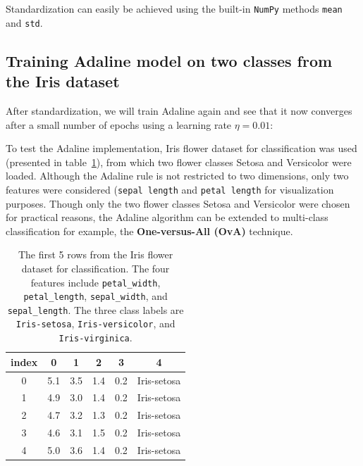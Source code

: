 \documentclass[11pt]{article}
\begin{document}
    Standardization can easily be achieved using the built-in \texttt{NumPy} methods \texttt{mean} and \texttt{std}.

    \subsection{Training Adaline model on two classes from the Iris dataset} \label{subsec:ada_iris}

    After standardization, we will train Adaline again and see that it now converges after a small number of epochs using a learning rate $\eta=0.01$:

    To test the Adaline implementation, Iris flower dataset for classification was used (presented in table~\ref{tab:iris}), from which two flower classes Setosa and Versicolor were loaded.
    Although the Adaline rule is not restricted to two dimensions, only two features were considered (\texttt{sepal length} and \texttt{petal length} for visualization purposes.
    Though only the two flower classes Setosa and Versicolor were chosen for practical reasons, the Adaline algorithm can be extended to multi-class classification \textemdash for example, the \textbf{One-versus-All (OvA)} technique.

    \begin{table}[h!]
        \centering
        \begin{tabular}{||c | c c c c | c||}
            \hline
            index & 0 & 1 & 2 & 3 & 4 \\
            \hline
            \hline
            0 & 5.1 & 3.5 & 1.4 & 0.2 & Iris-setosa \\
            \hline
            1 & 4.9 & 3.0 & 1.4 & 0.2 & Iris-setosa \\
            \hline
            2 & 4.7 & 3.2 & 1.3 & 0.2 & Iris-setosa \\
            \hline
            3 & 4.6 & 3.1 & 1.5 & 0.2 & Iris-setosa \\
            \hline
            4 & 5.0 & 3.6 & 1.4 & 0.2 & Iris-setosa \\
            \hline
        \end{tabular}
        \caption{The first 5 rows from the Iris flower dataset for classification.
        The four features include \texttt{petal\_width}, \texttt{petal\_length}, \texttt{sepal\_width}, and \texttt{sepal\_length}.
        The three class labels are \texttt{Iris-setosa}, \texttt{Iris-versicolor}, and \texttt{Iris-virginica}.}
        \label{tab:iris}

    \end{table}
\end{document}

